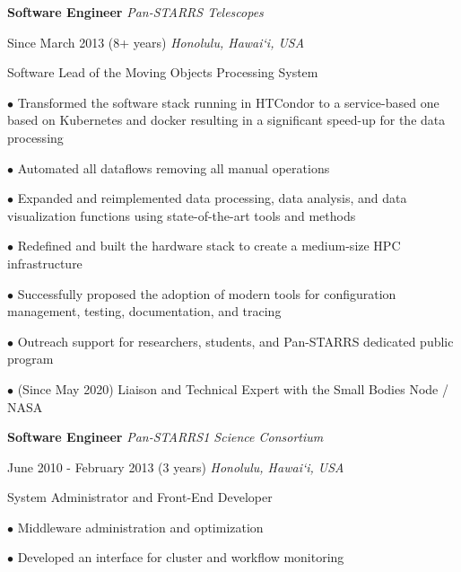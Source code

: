 \documentclass[12pt]{article}
\newcommand{\mynewsection}[2]{%
  \medskip

  \textbf{\color{colorsection}\LARGE {#2}\hspace{0.25in}{#1}}
}
\newcommand{\experience}[4]{%
  \medskip
  {\color{colorsection}\textbf{\large #1}}
  \hfill
  \textit{\small #2}

  {\small #3}
  \hfill    
  \textit{\small #4}}
\begin{document}
\begin{minipage}[t]{0.67\linewidth}
  \mynewsection{Experience}{\faBriefcase}
  
  \bigskip

  \experience{Software Engineer}{Pan-STARRS Telescopes}{Since March
    2013 (8+ years)}{Honolulu, Hawai`i, USA}

  \bigskip
  
  {\large Software Lead of the Moving Objects Processing System}

  \bigskip
  
  $\bullet$ Transformed the software stack running in HTCondor to a
  service-based one based on Kubernetes and docker resulting in a
  significant speed-up for the data processing

  \medskip
  
  $\bullet$ Automated all dataflows removing all manual
  operations

  \medskip

  $\bullet$ Expanded and reimplemented data processing, data analysis,
  and data visualization functions using state-of-the-art tools and
  methods

  \medskip

  $\bullet$ Redefined and built the hardware stack to create a
  medium-size HPC infrastructure
  
  \medskip

  $\bullet$ Successfully proposed the adoption of modern tools for
  configuration management, testing, documentation, and tracing

  \medskip

  $\bullet$ Outreach support for researchers, students, and Pan-STARRS
  dedicated public program

  \medskip

  $\bullet$ (Since May 2020) Liaison and Technical Expert with the Small Bodies
  Node / NASA

  \bigskip
  
  \experience{Software Engineer}{Pan-STARRS1 Science Consortium}{June
    2010 - February 2013 (3 years)}{Honolulu, Hawai`i, USA}

  \bigskip

  {\large System Administrator and Front-End Developer}
  
  \medskip

  $\bullet$ Middleware administration and optimization

  \medskip
  
  $\bullet$ Developed an interface for cluster and workflow monitoring
\end{minipage}
\end{document}
